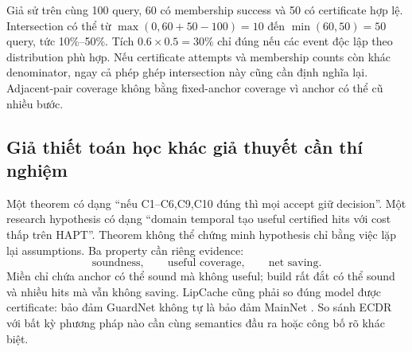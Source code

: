 \documentclass[11pt,a4paper]{article}
\theoremstyle{definition}
\begin{document}
Giả sử trên cùng 100 query, 60 có membership success và 50 có certificate
hợp lệ. Intersection có thể từ $\max(0,60+50-100)=10$ đến
$\min(60,50)=50$ query, tức 10\%--50\%. Tích $0.6\times0.5=30\%$ chỉ đúng
nếu các event độc lập theo distribution phù hợp. Nếu certificate attempts
và membership counts còn khác denominator, ngay cả phép ghép intersection
này cũng cần định nghĩa lại. Adjacent-pair coverage không bằng fixed-anchor
coverage vì anchor có thể cũ nhiều bước.

\subsection{Giả thiết toán học khác giả thuyết cần thí nghiệm}
Một theorem có dạng ``nếu C1--C6,C9,C10 đúng thì mọi accept giữ decision''.
Một research hypothesis có dạng ``domain temporal tạo useful certified hits
với cost thấp trên HAPT''. Theorem không thể chứng minh hypothesis chỉ bằng
việc lặp lại assumptions. Ba property cần riêng evidence:
\begin{equation}
\text{soundness},\qquad\text{useful coverage},\qquad\text{net saving}.
\end{equation}
Miền chỉ chứa anchor có thể sound mà không useful; build rất đắt có thể
sound và nhiều hits mà vẫn không saving. LipCache cũng phải so đúng model
được certificate: bảo đảm GuardNet không tự là bảo đảm MainNet
\cite{lipcache}. So sánh ECDR với bất kỳ phương pháp nào cần cùng semantics
đầu ra hoặc công bố rõ khác biệt.

\appendix
\end{document}
